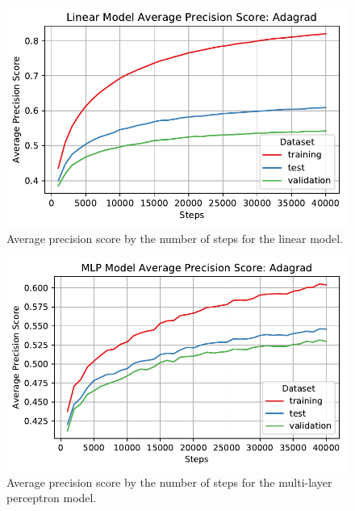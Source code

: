 \documentclass[letterpaper,11pt]{article}
\begin{document}
  \begin{figure}
    \centering
    \includegraphics{problem4/linear_average_precision_score_adagrad.pdf}
    \caption{Average precision score by the number of steps for the linear
      model.}
    \label{fig:linear_average_precision_score_adagrad}
  \end{figure}
  
  \begin{figure}
    \centering
    \includegraphics{problem4/mlp_average_precision_score_adagrad.pdf}
    \caption{Average precision score by the number of steps for the multi-layer
      perceptron model.}
    \label{fig:mlp_average_precision_score_adagrad}
  \end{figure}
\end{document}

